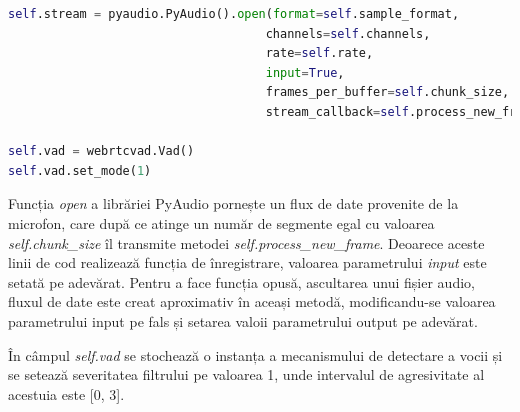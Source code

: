 \documentclass[a4paper,12pt]{book}
\begin{document}
		\begin{lstlisting}[language=Python, caption={Initializarea fluxului de transmitere a datelor pentru inregistrarea}]	
self.stream = pyaudio.PyAudio().open(format=self.sample_format,
									channels=self.channels,
									rate=self.rate,
									input=True,
									frames_per_buffer=self.chunk_size, 
									stream_callback=self.process_new_frame)

self.vad = webrtcvad.Vad()
self.vad.set_mode(1) \end{lstlisting}
		Funcția \textit{open} a librăriei PyAudio \cite{pyaudio} pornește un flux de date provenite de la microfon, care după ce atinge un număr de segmente egal cu valoarea \textit{self.chunk\_size} îl transmite metodei \textit{self.process\_new\_frame}. Deoarece aceste linii de cod realizează funcția de înregistrare, valoarea parametrului \textit{input} este setată pe adevărat. Pentru a face funcția opusă, ascultarea unui fișier audio, fluxul de date este creat aproximativ în aceași metodă, modificandu-se valoarea parametrului input pe fals și setarea valoii parametrului output pe adevărat. \par
		
		În câmpul \textit{self.vad} se stochează o instanța a mecanismului de detectare a vocii și se setează severitatea filtrului pe valoarea 1, unde intervalul de agresivitate al acestuia este [0, 3]. \par
\end{document}
